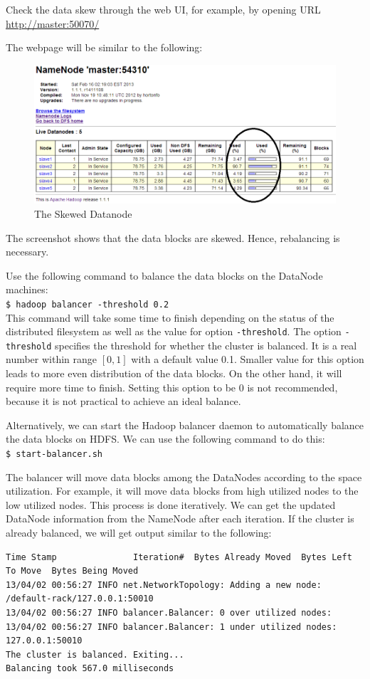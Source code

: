 Check the data skew through the web UI, for example, by opening URL \url{http://master:50070/}

The webpage will be similar to the following:
\begin{figure}[h]
  \centering
  \includegraphics[width=.8\textwidth]{figs/5163os_07_01.png}
  \caption{The Skewed Datanode}\label{fig:skewed.datanode}
\end{figure} 

The screenshot shows that the data blocks are skewed. Hence, rebalancing is necessary.

Use the following command to balance the data blocks on the DataNode machines: \\
\verb|$ hadoop balancer -threshold 0.2| \\
This command will take some time to finish depending on the status of the distributed filesystem as well as the value for option \verb|-threshold|. The option \verb|-threshold| specifies the threshold for whether the cluster is balanced. It is a real number within range $[0, 1]$ with a default value 0.1. Smaller value for this option leads to more even distribution of the data blocks. On the other hand, it will require more time to finish. Setting this option to be 0 is not recommended, because it is not practical to achieve an ideal balance.

Alternatively, we can start the Hadoop balancer daemon to automatically balance the data blocks on HDFS. We can use the following command to do this: \\
\verb|$ start-balancer.sh|

The balancer will move data blocks among the DataNodes according to the space utilization. For example, it will move data blocks from high utilized nodes to the low utilized nodes. This process is done iteratively. We can get the updated DataNode information from the NameNode after each iteration. If the cluster is already balanced, we will get output similar to the following:
\lstset{style=bashstyle}
\begin{lstlisting}
Time Stamp               Iteration#  Bytes Already Moved  Bytes Left To Move  Bytes Being Moved
13/04/02 00:56:27 INFO net.NetworkTopology: Adding a new node: /default-rack/127.0.0.1:50010
13/04/02 00:56:27 INFO balancer.Balancer: 0 over utilized nodes:
13/04/02 00:56:27 INFO balancer.Balancer: 1 under utilized nodes:  127.0.0.1:50010
The cluster is balanced. Exiting...
Balancing took 567.0 milliseconds
\end{lstlisting}

